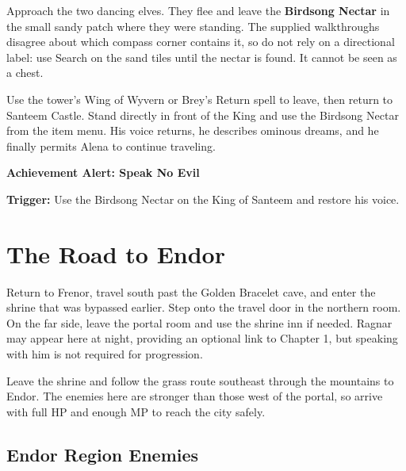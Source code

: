 \documentclass[
  american,
  10pt,
  letterpaper,
  oneside,
  open=any]{scrreprt}
\begin{document}
Approach the two dancing elves. They flee and leave the \textbf{Birdsong
Nectar} in the small sandy patch where they were standing. The supplied
walkthroughs disagree about which compass corner contains it, so do not
rely on a directional label: use Search on the sand tiles until the
nectar is found. It cannot be seen as a chest.

Use the tower's Wing of Wyvern or Brey's Return spell to leave, then
return to Santeem Castle. Stand directly in front of the King and use
the Birdsong Nectar from the item menu. His voice returns, he describes
ominous dreams, and he finally permits Alena to continue traveling.

\begin{achievementalert}

\textbf{Achievement Alert: Speak No Evil}

\textbf{Trigger:} Use the Birdsong Nectar on the King of Santeem and
restore his voice.

\end{achievementalert}

\section{The Road to Endor}\label{the-road-to-endor}

Return to Frenor, travel south past the Golden Bracelet cave, and enter
the shrine that was bypassed earlier. Step onto the travel door in the
northern room. On the far side, leave the portal room and use the shrine
inn if needed. Ragnar may appear here at night, providing an optional
link to Chapter 1, but speaking with him is not required for
progression.

Leave the shrine and follow the grass route southeast through the
mountains to Endor. The enemies here are stronger than those west of the
portal, so arrive with full HP and enough MP to reach the city safely.

\subsection{Endor Region Enemies}\label{endor-region-enemies}
\end{document}
